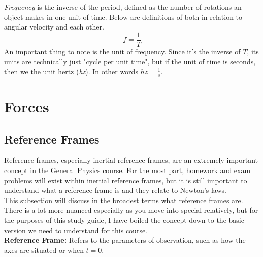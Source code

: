 \documentclass{article}
\begin{document}
\noindent \textit{Frequency} is the inverse of the period, defined as the number of rotations an object makes in one unit of time. Below are definitions of both in relation to angular velocity and each other. \\
\begin{equation}
    f = \frac{1}{T}
\end{equation}
An important thing to note is the unit of frequency. Since it's the inverse of $T$, its units are technically just "cycle per unit time", but if the unit of time is seconds, then we the unit hertz (\textit{hz}). In other words $hz = \frac{1}{s}$.

\newpage \section{Forces}
\subsection{Reference Frames}

Reference frames, especially inertial reference frames, are an extremely important concept in the General Physics course. For the most part, homework and exam problems will exist within inertial reference frames, but it is still important to understand what a reference frame is and they relate to Newton's laws. \\

\noindent This subsection will discuss in the broadest terms what reference frames are. There is a lot more nuanced especially as you move into special relatively, but for the purposes of this study guide, I have boiled the concept down to the basic version we need to understand for this course. \\

\noindent \textbf{Reference Frame:} Refers to the parameters of observation, such as how the axes are situated or when $t=0$. \\
\end{document}
